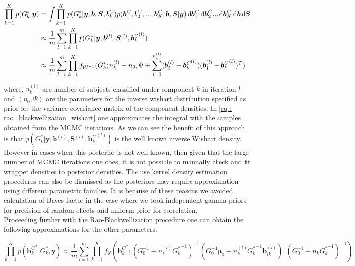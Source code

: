 \begin{equation}
\label{eq : rao_blackwellization_wishart}
\begin{split}
\prod_{k=1}^K p(G_k^*|\boldsymbol{y}) & = \int \prod_{k=1}^{K} p(G_k^*| \boldsymbol{y}, \boldsymbol{b}, \boldsymbol{S}, \boldsymbol{b}_k^C) p(\boldsymbol{b}_1^C, \boldsymbol{b}_2^C,..., \boldsymbol{b}_K^C,\boldsymbol{b}, \boldsymbol{S}|\boldsymbol{y}) 
\mathop{}\!\mathrm{d}{\boldsymbol{b}_1^C} \mathop{}\!\mathrm{d}{\boldsymbol{b}_2^C} ... \mathop{}\!\mathrm{d}{\boldsymbol{b}_K^C} \mathop{}\!\mathrm{d}{\boldsymbol{b}} \mathop{}\!\mathrm{d}{\boldsymbol{S}}\\
& \approx \frac 1 m \sum_{l=1}^m \prod_{k=1}^{K} p(G_k^*| \boldsymbol{y}, \boldsymbol{b}^{(l)}, \boldsymbol{S}^{(l)}, {\boldsymbol{b}_k^C}^{(l)
})\\
& \approx \frac 1 m \sum_{l=1}^m \prod_{k=1}^{K} f_{\mathcal{W}^{-1}}(G_k^*; n_k^{(l)}+n_0, \Psi + \sum_{i=1}^{n_k^{(l)}}(\boldsymbol{b_i}^{(l)} - {\boldsymbol{b}_k^C}^{(l)})(\boldsymbol{b_i}^{(l)} - {\boldsymbol{b}_k^C}^{(l)})^T)
\end{split}
\end{equation}

where, $n_k^{(l)}$ are number of subjects classified under component $k$ in iteration $l$ and $(n_0, \Psi)$ are the parameters for the inverse wishart distribution specified as prior for the variance covariance matrix of the component densities. In \ref{eq : rao_blackwellization_wishart} one approximates the integral with the samples obtained from the MCMC iterations. As we can see the benefit of this approach is that $p(G_k^*| \boldsymbol{y}, \boldsymbol{b}^{(l)}, \boldsymbol{S}^{(l)}, {\boldsymbol{b}_k^C}^{(l)})$ is the well known inverse Wishart density. However in cases when this posterior is not well known, then given that the large number of MCMC iterations one does, it is not possible to manually check and fit wrapper densities to posterior densities. The use kernel density estimation procedures can also be dismissed as the posteriors may require approximation using different parametric families. It is because of these reasons we avoided calculation of Bayes factor in the case where we took independent gamma priors for precision of random effects and uniform prior for correlation.\\

Proceeding further with the Rao-Blackwellization procedure one can obtain the following approximations for the other parameters.

\begin{equation}
\prod_{k=1}^K p({\boldsymbol{b}_k^C}^*|G_k^*, \boldsymbol{y}) \approx 
\frac 1 m \sum_{l=1}^m \prod_{k=1}^{K} f_N({\boldsymbol{b}_k^C}^*; (G_0^{-1} + n_k^{(l)} {G_k^*}^{-1})^{-1} (G_0^{-1}\boldsymbol{\mu}_0 + n_k^{(l)} {G_k^*}^{-1} \bar{\boldsymbol{b}_{ik}^{(l)}}) , (G_0^{-1} + n_k {G_k^*}^{-1})^{-1})
\end{equation}

